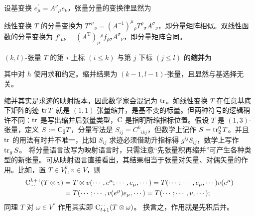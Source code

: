 \begin{theorem}
    设基变换 $e_\mu^{\prime}=A^\nu{ }_\mu e_\nu$，张量分量的变换律显然为
\end{theorem}
\begin{eg}
    线性变换 $T$ 的分量变换为 $T'^\mu{}_\nu= (A^{-1})^\mu{}_\rho T^\rho{}_\sigma A^\sigma{}_\nu$，即分量矩阵相似。双线性函数的分量变换为 $f'_{\mu\nu}=(A^\mathrm{T})_\mu{}^\rho f_{\rho\sigma} A^\sigma{}_\nu$，即分量矩阵合同。
\end{eg}

\begin{definition}
    $(k,l)$-张量 $ T $ 的第 $i$ 上标 $(i \leqslant k)$ 与第 $j$ 下标 $(j \leqslant l)$ 的\textbf{缩并}为
\vspace{-0.1\baselineskip}

\noindent 其中对 $h$ 使用求和约定。缩并结果为 $(k-1,l-1)$-张量，且显然与基选择无关。
\end{definition}

缩并其实是求迹的映射版本，因此数学家会混记为 $\tr$。如线性变换 $T$ 在任意基底下矩阵的迹 $\tr T$ 就是 $(1,1)$-张量缩并，是基不变的标量。但两种符号的逻辑稍许不同：$\tr$ 是写出缩并后张量类型，$\mathrm{C}$ 是指明所缩指标位置。假设 $T$ 是 $(1,3)$-张量，定义 $S:=\mathrm{C}^1_{2}T$，分量写法是 $S_{ij}=C^{k}{}_{ikj}$，但数学上记作 $S=\tr^0_2 T$。并且 $\tr$ 的用法有时并不唯一，比如 $S_{ij}$ 求迹必须借助升指标得 $g^{ij}S_{ij}$，数学上写作 $\tr_{g}S$。
将分量语言改写为映射语言时，只需注意“先张量积再缩并”可产生各种类型的新张量。可从映射语言直接看出，其结果相当于张量对矢量、对偶矢量的作用。比如，置 $T \in V^k_l,v \in V$，则
\begin{align*}
    \mathrm{C}_{\cdots}^{k+1}(T \otimes v)&=T \otimes v(\cdots,e^{\mu} ; \cdots,e_{\mu},\cdots)=T(\cdots;\cdots,e_{\mu},\cdots)v(e^\mu)\\
    &=T(\cdots;\cdots,v(e^\mu)e_{\mu},\cdots)=T(\cdots;\cdots,v,\cdots);
\end{align*}
同理 $T$ 对 $\omega\in V^*$ 作用其实即 $\mathrm{C}_{l+1}^{\cdots}(T \otimes \omega)$。
换言之，作用就是先积后并。

